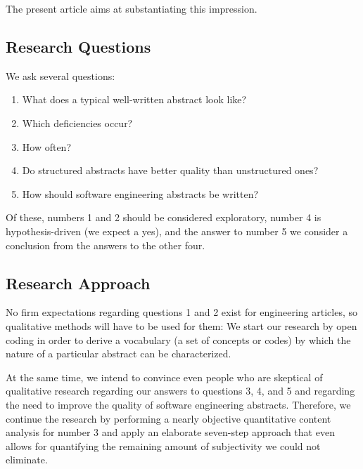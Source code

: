 \documentclass[10pt,journal,compsoc]{IEEEtran}
\begin{document}
The present article aims at substantiating this impression.




\subsection{Research Questions}

We ask several questions:
\begin{enumerate}
	\item What does a typical well-written abstract look like?
	\item Which deficiencies occur? 
	\item How often?
	\item Do structured abstracts have better quality than unstructured ones?
	\item How should software engineering abstracts be written?
\end{enumerate}
Of these, numbers 1 and 2 should be considered exploratory,
number 4 is hypothesis-driven (we expect a yes), and
the answer to number 5 we consider a conclusion from the answers to the other four. 


\subsection{Research Approach}

No firm expectations regarding questions 1 and 2 exist for engineering articles,
so qualitative methods will have to be used for them:
We start our research by open coding \cite{StrCor90} in order to derive a vocabulary (a set of concepts or codes)
by which the nature of a particular abstract can be characterized.

At the same time, we intend to convince even people who are skeptical of qualitative research
regarding our answers to questions 3, 4, and 5 and regarding the need to improve
the quality of software engineering abstracts.
Therefore, we continue the research by performing a nearly objective 
quantitative content analysis for number 3
and apply an elaborate seven-step approach that even allows for quantifying the
remaining amount of subjectivity we could not eliminate.
\end{document}
